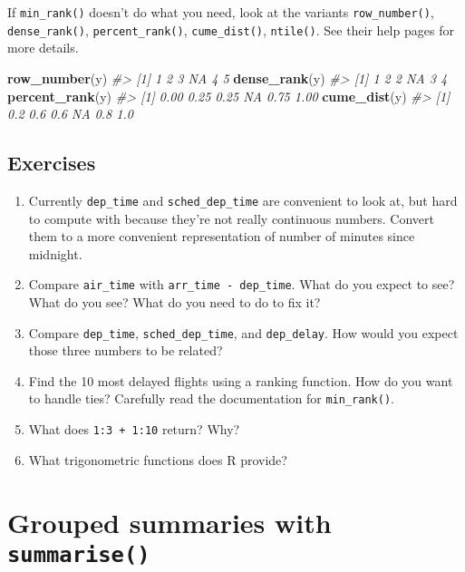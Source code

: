 \documentclass[]{book}
\newenvironment{Shaded}{\begin{snugshade}}{\end{snugshade}}
\newcommand{\KeywordTok}[1]{\textcolor[rgb]{0.13,0.29,0.53}{\textbf{{#1}}}}
\newcommand{\CommentTok}[1]{\textcolor[rgb]{0.56,0.35,0.01}{\textit{{#1}}}}
\newcommand{\NormalTok}[1]{{#1}}
\begin{document}
\begin{itemize}
  If \texttt{min\_rank()} doesn't do what you need, look at the variants
  \texttt{row\_number()}, \texttt{dense\_rank()},
  \texttt{percent\_rank()}, \texttt{cume\_dist()}, \texttt{ntile()}. See
  their help pages for more details.

\begin{Shaded}
\begin{Highlighting}[]
\KeywordTok{row_number}\NormalTok{(y)}
\CommentTok{#> [1]  1  2  3 NA  4  5}
\KeywordTok{dense_rank}\NormalTok{(y)}
\CommentTok{#> [1]  1  2  2 NA  3  4}
\KeywordTok{percent_rank}\NormalTok{(y)}
\CommentTok{#> [1] 0.00 0.25 0.25   NA 0.75 1.00}
\KeywordTok{cume_dist}\NormalTok{(y)}
\CommentTok{#> [1] 0.2 0.6 0.6  NA 0.8 1.0}
\end{Highlighting}
\end{Shaded}
\end{itemize}

\subsection{Exercises}\label{exercises-10}

\begin{enumerate}
\def\labelenumi{\arabic{enumi}.}
\item
  Currently \texttt{dep\_time} and \texttt{sched\_dep\_time} are
  convenient to look at, but hard to compute with because they're not
  really continuous numbers. Convert them to a more convenient
  representation of number of minutes since midnight.
\item
  Compare \texttt{air\_time} with \texttt{arr\_time\ -\ dep\_time}. What
  do you expect to see? What do you see? What do you need to do to fix
  it?
\item
  Compare \texttt{dep\_time}, \texttt{sched\_dep\_time}, and
  \texttt{dep\_delay}. How would you expect those three numbers to be
  related?
\item
  Find the 10 most delayed flights using a ranking function. How do you
  want to handle ties? Carefully read the documentation for
  \texttt{min\_rank()}.
\item
  What does \texttt{1:3\ +\ 1:10} return? Why?
\item
  What trigonometric functions does R provide?
\end{enumerate}

\section{\texorpdfstring{Grouped summaries with
\texttt{summarise()}}{Grouped summaries with summarise()}}\label{grouped-summaries-with-summarise}
\end{document}
